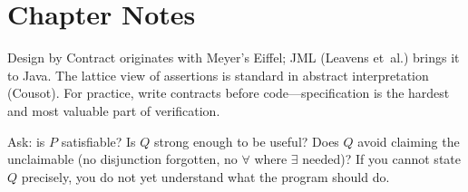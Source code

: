 \section*{Chapter Notes}
Design by Contract originates with Meyer's Eiffel; JML (Leavens et~al.) brings it to Java. The lattice view of assertions is standard in abstract interpretation (Cousot). For practice, write contracts before code—specification is the hardest and most valuable part of verification.

\smallskip
\begin{remark}
Ask: is $P$ satisfiable? Is $Q$ strong enough to be useful? Does $Q$ avoid claiming the unclaimable (no disjunction forgotten, no $\forall$ where $\exists$ needed)? If you cannot state $Q$ precisely, you do not yet understand what the program should do.
\end{remark}
